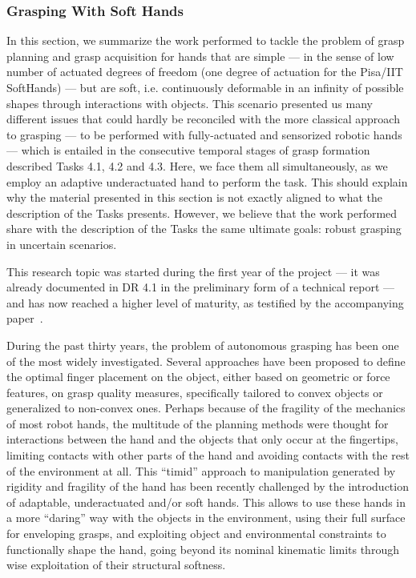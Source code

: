 
\subsubsection{Grasping With Soft Hands}

In this section, we summarize the work performed to tackle the problem of grasp planning and grasp acquisition for hands that are simple --- in the sense of low number of actuated degrees of freedom (one degree of actuation for the Pisa/IIT SoftHands) --- but are soft, i.e. continuously deformable in an infinity of possible shapes through interactions with objects. This scenario presented us many different issues that could hardly be reconciled with the more classical approach to grasping --- to be performed with fully-actuated and sensorized robotic hands --- which is entailed in the consecutive temporal stages of grasp formation described Tasks 4.1, 4.2 and 4.3. Here, we face them all simultaneously, as we employ an adaptive underactuated hand to perform the task. This should explain why the material presented in this section is not exactly aligned to what the description of the Tasks presents. However, we believe that the work performed share with the description of the Tasks the same ultimate goals: robust grasping in uncertain scenarios.

 This research topic was started during the first year of the project --- it was already documented in DR 4.1 in the preliminary form of a technical report --- and has now reached a higher level of maturity, as testified by the accompanying paper~\cite{Bonilla:Humanoids:2015}.

During the past thirty years, the problem of autonomous grasping has been one of the most widely investigated. Several approaches have been proposed to define the optimal finger placement on the object, either based on geometric or force features, on grasp quality measures, specifically tailored to convex objects or generalized to non-convex ones. Perhaps because of the fragility of the mechanics of most robot hands, the multitude of the planning methods were thought for interactions between the hand and the objects that only occur at the fingertips, limiting contacts with other parts of the hand and avoiding contacts with the rest of the environment at all. This ``timid'' approach to manipulation generated by rigidity and fragility of the hand has been recently challenged by the introduction of adaptable, underactuated and/or soft hands. This allows to use these hands in a more ``daring'' way with the objects in the environment, using their full surface for enveloping grasps, and exploiting object and environmental constraints to functionally shape the hand, going beyond its nominal kinematic limits through wise exploitation of their structural softness.

